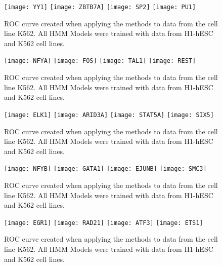 \documentclass[11pt,a4]{article}
\begin{document}
\begin{figure}[h]
\centering
    \texttt{[image: YY1]}
    \texttt{[image: ZBTB7A]}
    \texttt{[image: SP2]}
    \texttt{[image: PU1]}
\caption{ROC curve created when applying the methods to data from the cell line K562. All HMM Models were trained with data from H1-hESC and K562 cell lines.}
\label{fig:roc.K562.fdr_4.1}
\end{figure}

\begin{figure}[h]
\centering
    \texttt{[image: NFYA]}
    \texttt{[image: FOS]}
    \texttt{[image: TAL1]}
    \texttt{[image: REST]}
\caption{ROC curve created when applying the methods to data from the cell line K562. All HMM Models were trained with data from H1-hESC and K562 cell lines.}
\label{fig:roc.K562.fdr_4.2}
\end{figure}

\begin{figure}[h]
\centering
    \texttt{[image: ELK1]}
    \texttt{[image: ARID3A]}
    \texttt{[image: STAT5A]}
    \texttt{[image: SIX5]}
\caption{ROC curve created when applying the methods to data from the cell line K562. All HMM Models were trained with data from H1-hESC and K562 cell lines.}
\label{fig:roc.K562.fdr_4.3}
\end{figure}

\begin{figure}[h]
\centering
    \texttt{[image: NFYB]}
    \texttt{[image: GATA1]}
    \texttt{[image: EJUNB]}
    \texttt{[image: SMC3]}
\caption{ROC curve created when applying the methods to data from the cell line K562. All HMM Models were trained with data from H1-hESC and K562 cell lines.}
\label{fig:roc.K562.fdr_4.4}
\end{figure}

\begin{figure}[h]
\centering
    \texttt{[image: EGR1]}
    \texttt{[image: RAD21]}
    \texttt{[image: ATF3]}
    \texttt{[image: ETS1]}
\caption{ROC curve created when applying the methods to data from the cell line K562. All HMM Models were trained with data from H1-hESC and K562 cell lines.}
\label{fig:roc.K562.fdr_4.5}
\end{figure}
\end{document}
